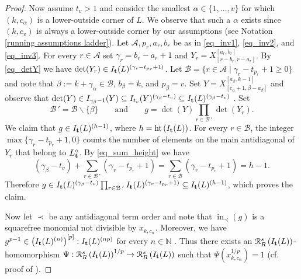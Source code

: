 \documentclass[12pt]{amsart}
\renewcommand{\geq}{\geqslant}
\theoremstyle{definition}
\renewcommand{\(}{\left(}
\renewcommand{\)}{\right)}
\newcommand{\NN}{\mathbb{N} }
\newcommand{\IN}{\operatorname{in}}
\newcommand{\cR}{\mathcal{R}}
\newcommand{\Ht}{\operatorname{ht}}
\renewcommand{\!}[1]{{\color{red}\text{\Huge$\star$ }#1}}
\newcommand{\ttt}{{\bf t}}
\begin{document}
\begin{proof}
Now assume $t_v>1$ and  consider the smallest $\alpha \in \{1,\ldots,v\}$ for which $(k,c_\alpha)$ is a lower-outside corner of $L$. We observe that such a $\alpha$ exists since $(k,c_v)$ is always a lower-outside corner by our  assumptions (see Notation \ref{running assumptions ladder}). %
Let $\mathcal{A},p_r, a_r, b_r$ be as in \autoref{eq_inv1}, \autoref{eq_inv2}, and \autoref{eq_inv3}. For every $r\in\mathcal{A}$ set $\gamma_r= b_r-a_r+1$ and  $Y_r=X^{[a_r,b_r]}_{[r-b_r,r-a_r]}$. 
 By \autoref{eq_detY} we have $\det(Y_r) \in I_\ttt(L)^{\left(\gamma_r-t_{p_r}+1\right)}$.  
 Let $\mathcal{B}=\{r \in \mathcal{A}\mid \gamma_r-t_{p_r}+1 \geq 0\}$   and note that $\beta:=k+\gamma_\alpha \in \mathcal{B}$, $b_\beta = k$,  and $p_\beta = v$. 
 Set $Y=X^{[a_{\beta},k-1]}_{[c_\alpha+1,\beta-a_{\beta}]}$ and observe that 
$ \det(Y) \in I_{\gamma_\beta-1}(Y) \subseteq I_{t_v}(Y)^{(\gamma_\beta-t_v)}\subseteq  I_\ttt(L)^{(\gamma_\beta-t_v)}$  \cite[Proposition 10.2]{BookDet}.
Set $$
\mathcal{B}\,' = \mathcal{B} \smallsetminus \{\beta\}
\qquad 
\text{and} 
\qquad
g=\det(Y)  \prod_{r \in \mathcal{B}\,'} \det(Y_r).$$ We claim that $g \in I_\ttt(L)^{(h-1)}$, where $h=\Ht\left(I_\ttt(L)\right)$. 
For every $r \in \mathcal{B}$, the integer $\max\{\gamma_r-t_{p_r}+1,0\}$ counts  the number of elements on the main antidiagonal of $Y_r$ that belong to $L^\circ_\ttt$. By \autoref{eq_sum_height} we  have
 $$(\gamma_{\beta}-t_v)+\sum_{r \in \mathcal{B}\,'}(\gamma_r-t_{p_r} + 1) =\sum_{r \in \mathcal{B}}(\gamma_r-t_{p_r} + 1)=  h-1.$$ 
 Therefore $g \in I_\ttt(L)^{(\gamma_{\beta}-t_v)}  \prod_{r \in \mathcal{B}\,'} I_\ttt(L)^{(\gamma_r-t_{p_r}+1)} \subseteq I_\ttt(L)^{(h-1)}$, which proves the claim. 
 

 
  Now let $\prec$ be any antidiagonal term order and note that  $\IN_\prec(g)$ is a squarefree monomial not divisible by $x_{k,c_\alpha}$. Moreover,  we have $g^{p-1}\in \left(I_{\ttt}(L)^{(n)}\right)^{[p]}:I_{\ttt}(L)^{(np)}$ for every $n\in \NN$ \cite[Lemma 2.6]{GrifoHuneke}. Thus there exists an $\cR^s_R\left(I_{\ttt}(L)\right)$-homomorphism
  $\Psi:\cR^s_R\left(I_{\ttt}(L)\right)^{1/p}\to\cR^s_R\left(I_{\ttt}(L)\right)$ such that 
 $\Psi\left(x_{k,c_\alpha}^{1/p}\right)=1$ (cf. proof of \cite[Theorem 6.7]{DSMNB}). 

  
  

\end{proof}
\end{document}
